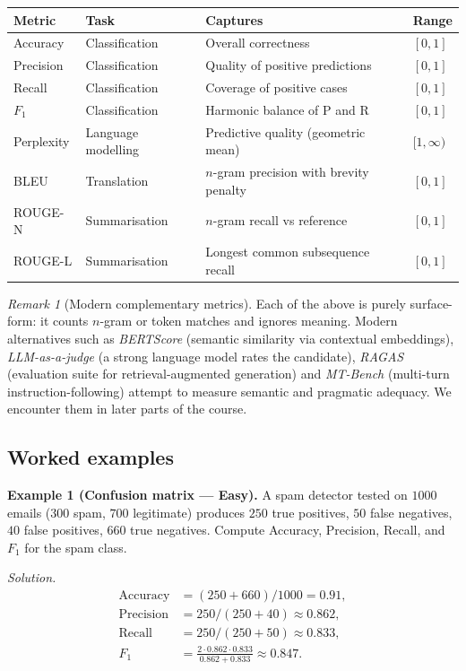 \documentclass[12pt,a4paper]{report}
\theoremstyle{definition}
\theoremstyle{remark}
\newtheorem{remark}{Remark}[section]
\begin{document}
\begin{center}
\begin{tabular}{|l|l|l|l|}
\hline
\textbf{Metric} & \textbf{Task} & \textbf{Captures} & \textbf{Range} \\
\hline
Accuracy & Classification & Overall correctness & $[0, 1]$ \\
Precision & Classification & Quality of positive predictions & $[0, 1]$ \\
Recall & Classification & Coverage of positive cases & $[0, 1]$ \\
$F_1$ & Classification & Harmonic balance of P and R & $[0, 1]$ \\
Perplexity & Language modelling & Predictive quality (geometric mean) & $[1, \infty)$ \\
BLEU & Translation & $n$-gram precision with brevity penalty & $[0, 1]$ \\
ROUGE-N & Summarisation & $n$-gram recall vs reference & $[0, 1]$ \\
ROUGE-L & Summarisation & Longest common subsequence recall & $[0, 1]$ \\
\hline
\end{tabular}
\end{center}

\begin{remark}[Modern complementary metrics]
Each of the above is purely surface-form: it counts $n$-gram or token matches and ignores meaning. Modern alternatives such as \emph{BERTScore} (semantic similarity via contextual embeddings), \emph{LLM-as-a-judge} (a strong language model rates the candidate), \emph{RAGAS} (evaluation suite for retrieval-augmented generation) and \emph{MT-Bench} (multi-turn instruction-following) attempt to measure semantic and pragmatic adequacy. We encounter them in later parts of the course.
\end{remark}

\subsection{Worked examples}

\textbf{Example 1 (Confusion matrix --- Easy).}
A spam detector tested on $1000$ emails ($300$ spam, $700$ legitimate) produces $250$ true positives, $50$ false negatives, $40$ false positives, $660$ true negatives. Compute Accuracy, Precision, Recall, and $F_1$ for the spam class.

\textit{Solution.}
\begin{align*}
\mathrm{Accuracy} &= (250 + 660) / 1000 = 0.91, \\
\mathrm{Precision} &= 250 / (250 + 40) \approx 0.862, \\
\mathrm{Recall} &= 250 / (250 + 50) \approx 0.833, \\
F_1 &= \frac{2 \cdot 0.862 \cdot 0.833}{0.862 + 0.833} \approx 0.847.
\end{align*}
\end{document}
